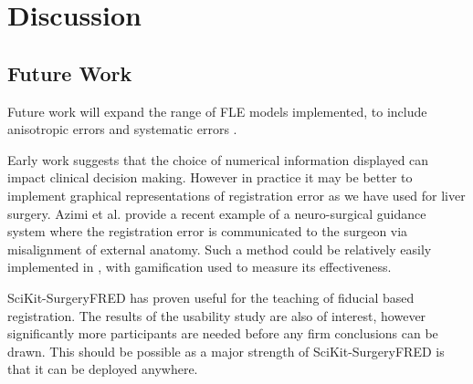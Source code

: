 \section{Discussion}
\subsection{Future Work}
Future work will expand the range of \gls{FLE} models implemented, to include anisotropic \cite{4359072} 
errors and systematic errors \cite{6294449}. 

Early work suggests that the choice of numerical information displayed can impact 
clinical decision making. However in practice it may be better to implement 
graphical representations of registration error as we have used for 
liver surgery\cite{PMID:29663273}. Azimi et al. \cite{10.1007/978-3-030-59716-0_7} 
provide a recent example of a neuro-surgical guidance system where the 
registration error is communicated to the surgeon via misalignment of 
external anatomy. Such a method could be relatively easily implemented in \fred, with
gamification used to measure its effectiveness. 

SciKit-SurgeryFRED has proven useful for the teaching of fiducial based registration. The results of the usability study 
are also of interest, however significantly more participants are needed before any firm conclusions can be drawn. This 
should be possible as a major strength of SciKit-SurgeryFRED is that it can be deployed anywhere. 








